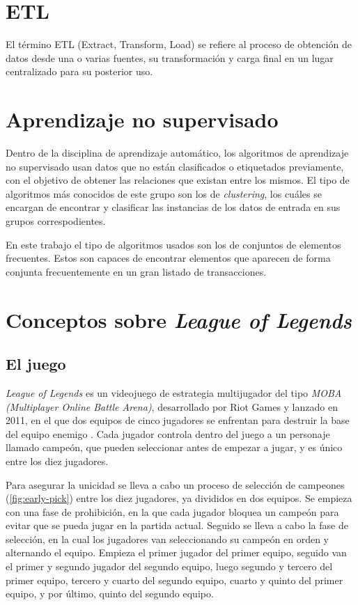 
\section{ETL}
El término ETL (Extract, Transform, Load) se refiere al proceso de obtención de datos desde una o varias fuentes, su transformación y carga final en un lugar centralizado para su posterior uso.

\section{Aprendizaje no supervisado}
Dentro de la disciplina de aprendizaje automático, los algoritmos de aprendizaje no supervisado usan datos que no están clasificados o etiquetados previamente, con el objetivo de obtener las relaciones que existan entre los mismos. El tipo de algoritmos más conocidos de este grupo son los de \textit{clustering}, los cuáles se encargan de encontrar y clasificar las instancias de los datos de entrada en sus grupos correspodientes.

En este trabajo el tipo de algoritmos usados son los de conjuntos de elementos frecuentes. Estos son capaces de encontrar elementos que aparecen de forma conjunta frecuentemente en un gran listado de transacciones.

\section{Conceptos sobre \textit{League of Legends}}

\subsection{El juego}
\textit{League of Legends} es un videojuego de estrategia multijugador del tipo \textit{MOBA (Multiplayer Online Battle Arena)}, desarrollado por Riot Games y lanzado en 2011, en el que dos equipos de cinco jugadores se enfrentan para destruir la base del equipo enemigo \cite{misc:como-jugar}. Cada jugador controla dentro del juego a un personaje llamado campeón, que pueden seleccionar antes de empezar a jugar, y es único entre los diez jugadores.

Para asegurar la unicidad se lleva a cabo un proceso de selección de campeones (\ref{fig:early-pick}) entre los diez jugadores, ya divididos en dos equipos. Se empieza con una fase de prohibición, en la que cada jugador bloquea un campeón para evitar que se pueda jugar en la partida actual. Seguido se lleva a cabo la fase de selección, en la cual los jugadores van seleccionando su campeón en orden y alternando el equipo. Empieza el primer jugador del primer equipo, seguido van el primer y segundo jugador del segundo equipo, luego segundo y tercero del primer equipo, tercero y cuarto del segundo equipo, cuarto y quinto del primer equipo, y por último, quinto del segundo equipo.

